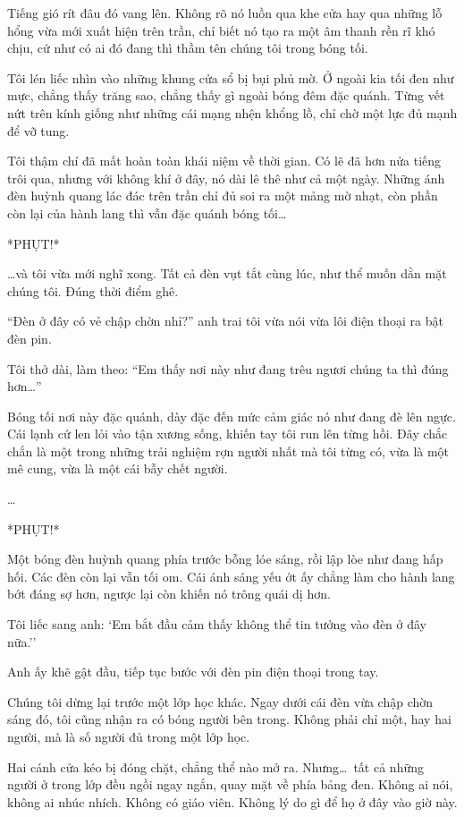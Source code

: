 \documentclass[../main.tex]{subfiles}
\begin{document}
Tiếng gió rít đâu đó vang lên. Không rõ nó luồn qua khe cửa hay qua những lỗ hổng vừa mới xuất hiện trên trần, chỉ biết nó tạo ra một âm thanh rền rĩ khó chịu, cứ như có ai đó đang thì thầm tên chúng tôi trong bóng tối.

Tôi lén liếc nhìn vào những khung cửa sổ bị bụi phủ mờ. Ở ngoài kia tối đen như mực, chẳng thấy trăng sao, chẳng thấy gì ngoài bóng đêm đặc quánh. Từng vết nứt trên kính giống như những cái mạng nhện khổng lồ, chỉ chờ một lực đủ mạnh để vỡ tung.

Tôi thậm chí đã mất hoàn toàn khái niệm về thời gian. Có lẽ đã hơn nửa tiếng trôi qua, nhưng với không khí ở đây, nó dài lê thê như cả một ngày. Những ánh đèn huỳnh quang lác đác trên trần chỉ đủ soi ra một mảng mờ nhạt, còn phần còn lại của hành lang thì vẫn đặc quánh bóng tối\dots

*PHỤT!*

\dots và tôi vừa mới nghĩ xong. Tất cả đèn vụt tắt cùng lúc, như thể muốn dằn mặt chúng tôi. Đúng thời điểm ghê.

``Đèn ở đây có vẻ chập chờn nhỉ?'' anh trai tôi vừa nói vừa lôi điện thoại ra bật đèn pin.

Tôi thở dài, làm theo: ``Em thấy nơi này như đang trêu ngươi chúng ta thì đúng hơn\dots''

Bóng tối nơi này đặc quánh, dày đặc đến mức cảm giác nó như đang đè lên ngực. Cái lạnh cứ len lỏi vào tận xương sống, khiến tay tôi run lên từng hồi. Đây chắc chắn là một trong những trải nghiệm rợn người nhất mà tôi từng có, vừa là một mê cung, vừa là một cái bẫy chết người.

\dots

*PHỤT!*

Một bóng đèn huỳnh quang phía trước bỗng lóe sáng, rồi lập lòe như đang hấp hối. Các đèn còn lại vẫn tối om. Cái ánh sáng yếu ớt ấy chẳng làm cho hành lang bớt đáng sợ hơn, ngược lại còn khiến nó trông quái dị hơn.

Tôi liếc sang anh: `Em bắt đầu cảm thấy không thể tin tưởng vào đèn ở đây nữa.''

Anh ấy khẽ gật đầu, tiếp tục bước với đèn pin điện thoại trong tay.

Chúng tôi dừng lại trước một lớp học khác. Ngay dưới cái đèn vừa chập chờn sáng đó, tôi cũng nhận ra có bóng người bên trong. Không phải chỉ một, hay hai người, mà là số người đủ trong một lớp học.

Hai cánh cửa kéo bị đóng chặt, chẳng thể nào mở ra. Nhưng\dots\ tất cả những người ở trong lớp đều ngồi ngay ngắn, quay mặt về phía bảng đen. Không ai nói, không ai nhúc nhích. Không có giáo viên. Không lý do gì để họ ở đây vào giờ này.
\end{document}
